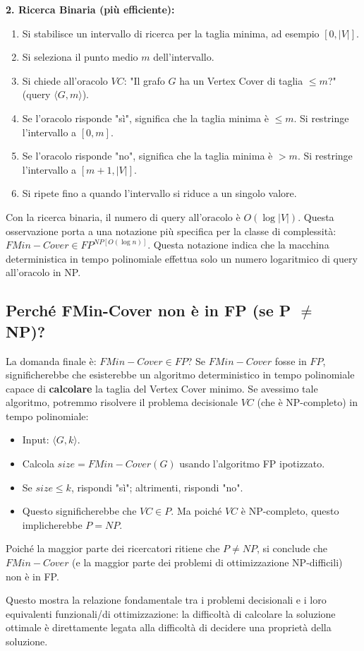 \documentclass[a4paper]{article}
\theoremstyle{definition} %
\begin{document}
\textbf{2. Ricerca Binaria (più efficiente):}
\begin{enumerate}
    \item Si stabilisce un intervallo di ricerca per la taglia minima, ad esempio $[0, |V|]$.
    \item Si seleziona il punto medio $m$ dell'intervallo.
    \item Si chiede all'oracolo $VC$: "Il grafo $G$ ha un Vertex Cover di taglia $\le m$?" (query $\langle G, m \rangle$).
    \item Se l'oracolo risponde "sì", significa che la taglia minima è $\le m$. Si restringe l'intervallo a $[0, m]$.
    \item Se l'oracolo risponde "no", significa che la taglia minima è $> m$. Si restringe l'intervallo a $[m+1, |V|]$.
    \item Si ripete fino a quando l'intervallo si riduce a un singolo valore.
\end{enumerate}
Con la ricerca binaria, il numero di query all'oracolo è $O(\log |V|)$.
Questa osservazione porta a una notazione più specifica per la classe di complessità:
$FMin-Cover \in FP^{NP[O(\log n)]}$. Questa notazione indica che la macchina deterministica in tempo polinomiale effettua solo un numero logaritmico di query all'oracolo in NP.

\subsection{Perché FMin-Cover non è in FP (se P $\neq$ NP)?}
La domanda finale è: $FMin-Cover \in FP$?
Se $FMin-Cover$ fosse in $FP$, significherebbe che esisterebbe un algoritmo deterministico in tempo polinomiale capace di \textbf{calcolare} la taglia del Vertex Cover minimo.
Se avessimo tale algoritmo, potremmo risolvere il problema decisionale $VC$ (che è NP-completo) in tempo polinomiale:
\begin{itemize}
    \item Input: $\langle G, k \rangle$.
    \item Calcola $size = FMin-Cover(G)$ usando l'algoritmo FP ipotizzato.
    \item Se $size \le k$, rispondi "sì"; altrimenti, rispondi "no".
\item Questo significherebbe che $VC \in P$. Ma poiché $VC$ è NP-completo, questo implicherebbe $P=NP$.
\end{itemize}
Poiché la maggior parte dei ricercatori ritiene che $P \neq NP$, si conclude che $FMin-Cover$ (e la maggior parte dei problemi di ottimizzazione NP-difficili) non è in FP.

Questo mostra la relazione fondamentale tra i problemi decisionali e i loro equivalenti funzionali/di ottimizzazione: la difficoltà di calcolare la soluzione ottimale è direttamente legata alla difficoltà di decidere una proprietà della soluzione.
\end{document}
